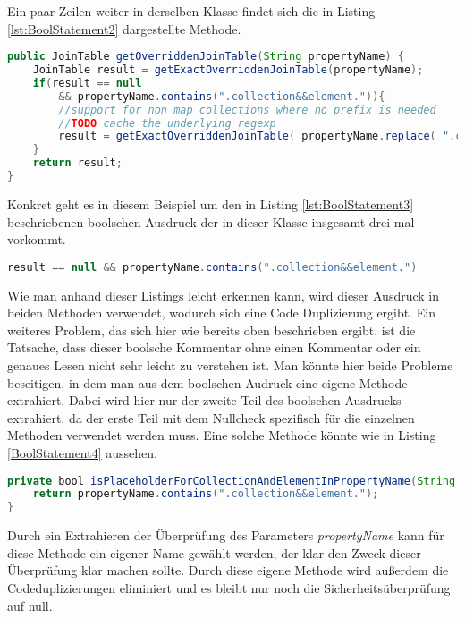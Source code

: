 Ein paar Zeilen weiter in derselben Klasse findet sich die in Listing \ref{lst:BoolStatement2} dargestellte Methode.

\begin{lstlisting}[language=Java, caption=Komplexe boolsche Ausdrücke 2 Zeile 305 - 313, label=lst:BoolStatement2]
public JoinTable getOverriddenJoinTable(String propertyName) {
	JoinTable result = getExactOverriddenJoinTable(propertyName);
	if(result == null 
		&& propertyName.contains(".collection&&element.")){
		//support for non map collections where no prefix is needed
		//TODO cache the underlying regexp
		result = getExactOverriddenJoinTable( propertyName.replace( ".collection&&element.", "."  ) );
	}
	return result;
}
\end{lstlisting}

Konkret geht es in diesem Beispiel um den in Listing \ref{lst:BoolStatement3} beschriebenen boolschen Ausdruck der in dieser Klasse insgesamt drei mal vorkommt.

\begin{lstlisting}[language=Java, caption=Boolscher Audruck, label=lst:BoolStatement3]
result == null && propertyName.contains(".collection&&element.")
\end{lstlisting}

Wie man anhand dieser Listings leicht erkennen kann, wird dieser Ausdruck in beiden Methoden verwendet, wodurch sich eine Code Duplizierung ergibt. Ein weiteres Problem, das sich hier wie bereits oben beschrieben ergibt, ist die Tatsache, dass dieser boolsche Kommentar ohne einen Kommentar oder ein genaues Lesen nicht sehr leicht zu verstehen ist. Man könnte hier beide Probleme beseitigen, in dem man aus dem boolschen Audruck eine eigene Methode extrahiert. Dabei wird hier nur der zweite Teil des boolschen Ausdrucks extrahiert, da der erste Teil mit dem Nullcheck spezifisch für die einzelnen Methoden verwendet werden muss. Eine solche Methode könnte wie in Listing \ref{BoolStatement4} aussehen.

\begin{lstlisting}[language=Java, caption=Boolscher Ausdruck neu, label=lst:BoolStatement4]
private bool isPlaceholderForCollectionAndElementInPropertyName(String propertyName) {
	return propertyName.contains(".collection&&element.");
}
\end{lstlisting}

Durch ein Extrahieren der Überprüfung des Parameters \textit{propertyName} kann für diese Methode ein eigener Name gewählt werden, der klar den Zweck dieser Überprüfung klar machen sollte. Durch diese eigene Methode wird außerdem die Codeduplizierungen eliminiert und es bleibt nur noch die Sicherheitsüberprüfung auf null.

